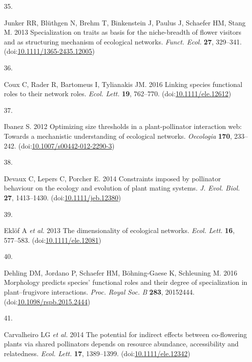 \documentclass[
  12pt,
  a4paper,
]{article}
\newlength{\cslhangindent}
\newlength{\csllabelwidth}
\newlength{\cslentryspacingunit} %
\newenvironment{CSLReferences}[2] %
 {%
  \setlength{\parindent}{0pt}
  \ifodd #1
  \let\oldpar\par
  \def\par{\hangindent=\cslhangindent\oldpar}
  \fi
  \setlength{\parskip}{#2\cslentryspacingunit}
 }%
 {}
\newcommand{\CSLLeftMargin}[1]{\parbox[t]{\csllabelwidth}{#1}}
\newcommand{\CSLRightInline}[1]{\parbox[t]{\linewidth - \csllabelwidth}{#1}\break}
\begin{document}
\begin{CSLReferences}{0}{0}
\leavevmode{}%
\CSLLeftMargin{35. }
\CSLRightInline{Junker RR, Blüthgen N, Brehm T, Binkenstein J, Paulus J, Schaefer HM, Stang M. 2013 Specialization on traits as basis for the niche-breadth of flower visitors and as structuring mechanism of ecological networks. \emph{Funct. Ecol.} \textbf{27}, 329--341. (doi:\href{https://doi.org/10.1111/1365-2435.12005}{10.1111/1365-2435.12005})}

\leavevmode{}%
\CSLLeftMargin{36. }
\CSLRightInline{Coux C, Rader R, Bartomeus I, Tylianakis JM. 2016 Linking species functional roles to their network roles. \emph{Ecol. Lett.} \textbf{19}, 762--770. (doi:\href{https://doi.org/10.1111/ele.12612}{10.1111/ele.12612})}

\leavevmode{}%
\CSLLeftMargin{37. }
\CSLRightInline{Ibanez S. 2012 Optimizing size thresholds in a plant-pollinator interaction web: Towards a mechanistic understanding of ecological networks. \emph{Oecologia} \textbf{170}, 233--242. (doi:\href{https://doi.org/10.1007/s00442-012-2290-3}{10.1007/s00442-012-2290-3})}

\leavevmode{}%
\CSLLeftMargin{38. }
\CSLRightInline{Devaux C, Lepers C, Porcher E. 2014 Constraints imposed by pollinator behaviour on the ecology and evolution of plant mating systems. \emph{J. Evol. Biol.} \textbf{27}, 1413--1430. (doi:\href{https://doi.org/10.1111/jeb.12380}{10.1111/jeb.12380})}

\leavevmode{}%
\CSLLeftMargin{39. }
\CSLRightInline{Eklöf A \emph{et al.} 2013 The dimensionality of ecological networks. \emph{Ecol. Lett.} \textbf{16}, 577--583. (doi:\href{https://doi.org/10.1111/ele.12081}{10.1111/ele.12081})}

\leavevmode{}%
\CSLLeftMargin{40. }
\CSLRightInline{Dehling DM, Jordano P, Schaefer HM, Böhning-Gaese K, Schleuning M. 2016 Morphology predicts species' functional roles and their degree of specialization in plant--frugivore interactions. \emph{Proc. Royal Soc. B} \textbf{283}, 20152444. (doi:\href{https://doi.org/10.1098/rspb.2015.2444}{10.1098/rspb.2015.2444})}

\leavevmode{}%
\CSLLeftMargin{41. }
\CSLRightInline{Carvalheiro LG \emph{et al.} 2014 The potential for indirect effects between co-flowering plants via shared pollinators depends on resource abundance, accessibility and relatedness. \emph{Ecol. Lett.} \textbf{17}, 1389--1399. (doi:\href{https://doi.org/10.1111/ele.12342}{10.1111/ele.12342})}


\end{CSLReferences}
\end{document}
